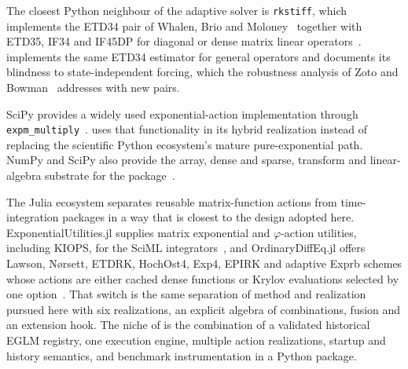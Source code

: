 The closest Python neighbour of the adaptive solver is \texttt{rkstiff}, which
implements the ETD34 pair of Whalen, Brio and
Moloney~\cite{WhalenBrioMoloney2015} together with ETD35, IF34 and IF45DP for
diagonal or dense matrix linear operators~\cite{rkstiff}.  \pkg{} implements the same ETD34
estimator for general operators and documents its blindness to
state-independent forcing, which the robustness analysis of Zoto and
Bowman~\cite{ZotoBowman2023} addresses with new pairs.

SciPy provides a widely used exponential-action implementation through
\texttt{expm\_multiply}~\cite{AlMohyHigham2011,VirtanenEtAl2020}.  \pkg{} uses
that functionality in its hybrid realization instead of replacing the
scientific Python ecosystem's mature pure-exponential path.  NumPy and SciPy
also provide the array, dense and sparse, transform and linear-algebra
substrate for the package~\cite{HarrisEtAl2020,VirtanenEtAl2020}.

The Julia ecosystem separates reusable matrix-function actions from
time-integration packages in a way that is closest to the design adopted
here.  ExponentialUtilities.jl supplies matrix exponential and $\varphi$-action
utilities, including KIOPS, for the SciML
integrators~\cite{ExponentialUtilities2026}, and OrdinaryDiffEq.jl offers
Lawson, N{\o}rsett, ETDRK, HochOst4, Exp4, EPIRK and adaptive Exprb schemes
whose actions are either cached dense functions or Krylov evaluations
selected by one option~\cite{OrdinaryDiffEqExponential}.  That switch is the
same separation of method and realization pursued here with six realizations,
an explicit algebra of combinations, fusion and an extension hook.  The niche
of \pkg{} is the combination of a validated historical EGLM registry, one
execution engine, multiple action realizations, startup and history semantics,
and benchmark instrumentation in a Python package.

